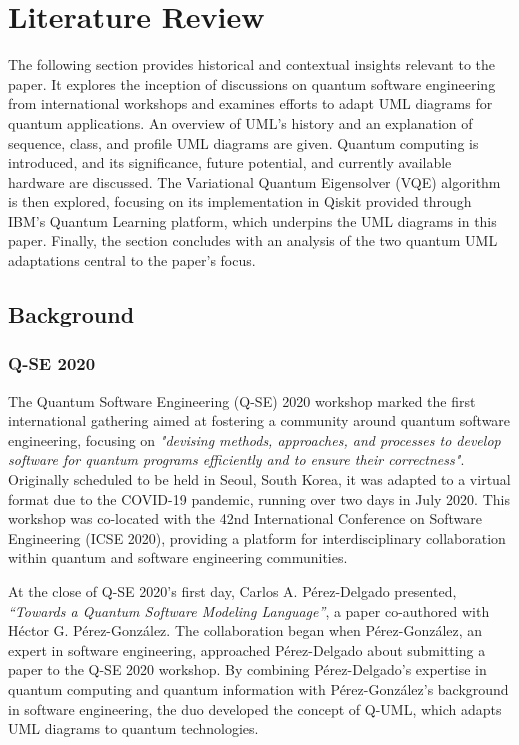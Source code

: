 \documentclass{article}
\begin{document}
{\section{Literature Review}

The following section provides historical and contextual insights relevant to the paper. It explores the inception of discussions on quantum software engineering from international workshops and examines efforts to adapt UML diagrams for quantum applications. An overview of UML's history and an explanation of sequence, class, and profile UML diagrams are given. Quantum computing is introduced, and its significance, future potential, and currently available hardware are discussed. The Variational Quantum Eigensolver (VQE) algorithm is then explored, focusing on its implementation in Qiskit provided through IBM's Quantum Learning platform, which underpins the UML diagrams in this paper. Finally, the section concludes with an analysis of the two quantum UML adaptations central to the paper's focus.

\subsection{Background}

\subsubsection{Q-SE 2020}

The Quantum Software Engineering (Q-SE) 2020 workshop marked the first international gathering aimed at fostering a community around quantum software engineering, focusing on \textit{"devising methods, approaches, and processes to develop software for quantum programs efficiently and to ensure their correctness"}\cite{QSE2020}. Originally scheduled to be held in Seoul, South Korea, it was adapted to a virtual format due to the COVID-19 pandemic, running over two days in July 2020. This workshop was co-located with the 42nd International Conference on Software Engineering (ICSE 2020), providing a platform for interdisciplinary collaboration within quantum and software engineering communities.

At the close of Q-SE 2020's first day, Carlos A. Pérez-Delgado presented, \textit{“Towards a Quantum Software Modeling Language”}, a paper co-authored with Héctor G. Pérez-González\cite{Perez-Delgado2020}. The collaboration began when Pérez-González, an expert in software engineering, approached Pérez-Delgado about submitting a paper to the Q-SE 2020 workshop. By combining Pérez-Delgado's expertise in quantum computing and quantum information with Pérez-González's background in software engineering, the duo developed the concept of Q-UML, which adapts UML diagrams to quantum technologies\cite{Towards}.

}
\end{document}
